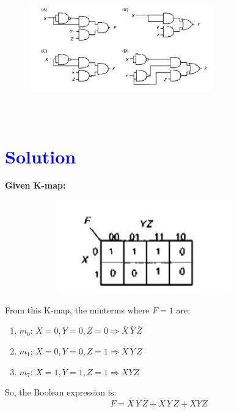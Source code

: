 \documentclass[a4paper,12pt]{article}
\begin{document}
\vspace{1em}
\begin{figure}[!h]
 \centering
     \includegraphics[width=8cm,height=6cm]{img2.png}
     \caption{}

 \end{figure}
 \section*{\textcolor{blue}{Solution}}
 
\textbf{Given K-map:}
\vspace{1cm}
\begin{figure}[!h]
\centering
  \includegraphics[width=10cm,height=4cm]{img1.png}
 \caption{}
\end{figure}
\vspace{0.5em}

From this K-map, the minterms where \( F = 1 \) are:

\begin{enumerate}
    \item \( m_0 \): \( X = 0, Y = 0, Z = 0 \Rightarrow \overline{X} \, \overline{Y} \, \overline{Z} \)
    \item \( m_1 \): \( X = 0, Y = 0, Z = 1 \Rightarrow \overline{X} \, \overline{Y} \, Z \)
    \item \( m_7 \): \( X = 1, Y = 1, Z = 1 \Rightarrow X Y Z \)
\end{enumerate}

So, the Boolean expression is:
\[
F = \overline{X} \, \overline{Y} \, \overline{Z} + \overline{X} \, \overline{Y} \, Z + X Y Z
\]
\end{document}
